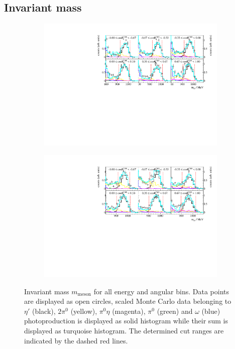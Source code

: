 \subsection{Invariant mass}
\begin{figure}[H]
	\centering
	\begin{subfigure}{\linewidth}
		\includegraphics[width=\linewidth]{../figs/hydrogen/bin_cuts/invcut_ebin1.pdf}
	\end{subfigure}
	
	\begin{subfigure}{\linewidth}
		\includegraphics[width=\linewidth]{../figs/hydrogen/bin_cuts/invcut_ebin2.pdf}
	\end{subfigure}
\caption{Invariant mass $m_\text{meson}$ for all energy and angular bins. Data points are displayed as open circles, scaled Monte Carlo data belonging to $\eta'$ (black), $2\pi^0$ (yellow), $\pi^0\eta$ (magenta), $\pi^0$ (green) and $\omega$ (blue) photoproduction is displayed as solid histogram while their sum is displayed as turquoise histogram. The determined cut ranges are indicated by the dashed red lines.}
\end{figure}
